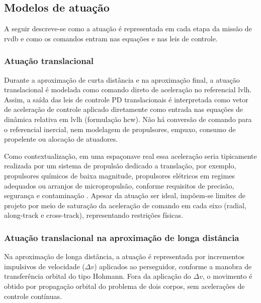 \subsection{Modelos de atuação}
\label{subsec:modelos_atuacao}

A seguir descreve-se como a atuação é representada em cada etapa da missão de \gls{rvdb} e como os comandos entram nas equações e nas leis de controle.

\subsubsection{Atuação translacional}
\label{subsubsec:atuacao_translacional}

Durante a aproximação de curta distância e na aproximação final, a atuação translacional é modelada como comando direto de aceleração no referencial \gls{lvlh}.
Assim, a saída das leis de controle PD translacionais é interpretada como vetor de aceleração de controle aplicado diretamente como entrada nas equações de dinâmica relativa em \gls{lvlh} (formulação \gls{hcw}).
Não há conversão de comando para o referencial inercial, nem modelagem de propulsores, empuxo, consumo de propelente ou alocação de atuadores.

Como contextualização, em uma espaçonave real essa aceleração seria tipicamente realizada por um sistema de propulsão dedicado a translação, por exemplo, propulsores químicos de baixa magnitude, propulsores elétricos em regimes adequados ou arranjos de micropropulsão, conforme requisitos de precisão, segurança e contaminação \cite{wertz2011sme_smad}.
Apesar da atuação ser ideal, impõem-se limites de projeto por meio de saturação da aceleração de comando em cada eixo (radial, along-track e cross-track), representando restrições físicas.

\subsubsection{Atuação translacional na aproximação de longa distância}
\label{subsubsec:atuacao_translacional_longa}

Na aproximação de longa distância, a atuação é representada por incrementos impulsivos de velocidade ($\Delta v$) aplicados ao perseguidor, conforme a manobra de transferência orbital do tipo Hohmann.
Fora da aplicação do $\Delta v$, o movimento é obtido por propagação orbital do problema de dois corpos, sem acelerações de controle contínuas.

